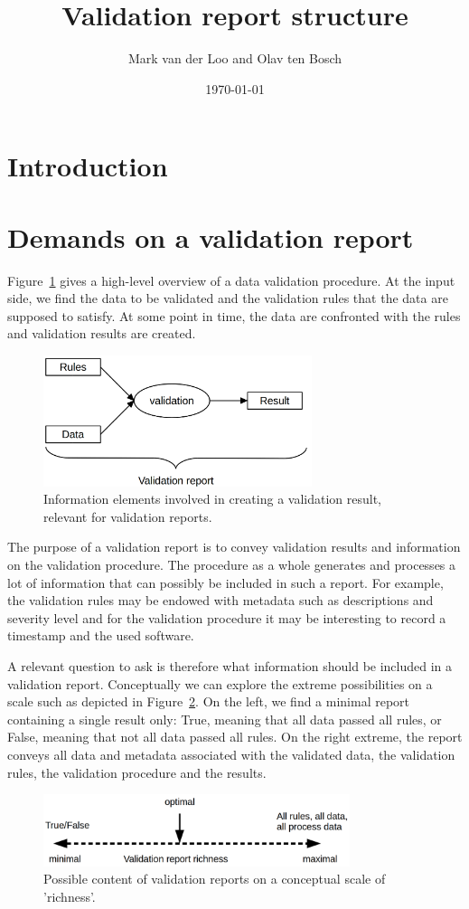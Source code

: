 \documentclass[a4paper, 11pt]{article}
\title{Validation report structure}
\author{Mark van der Loo and Olav ten Bosch}
\date{\today}
\begin{document}
\maketitle{}


\section{Introduction}

\section{Demands on a validation report}
Figure~\ref{fig:validation} gives a high-level overview of a data validation
procedure. At the input side, we find the data to be validated and the
validation rules that the data are supposed to satisfy. At some point in time,
the data are confronted with the rules and validation results are created. 
%
\begin{figure}
\centering
\includegraphics[width=0.7\textwidth]{fig/validation.png}
\caption{Information elements involved in creating a validation result, relevant for validation reports.}
\label{fig:validation}
\end{figure}

The purpose of a validation report is to convey validation results and
information on the validation procedure. The procedure as a whole generates and
processes a lot of information that can possibly be included in such a report.
For example, the validation rules may be endowed with metadata such as
descriptions and severity level and for the validation procedure it may be
interesting to record a timestamp and the used software.

A relevant question to ask is therefore what information should be included in
a validation report. Conceptually we can explore the extreme possibilities on a
scale such as depicted in Figure~\ref{fig:richness}. On the left, we find a minimal report
containing a single result only: True, meaning that all data passed all rules,
or False, meaning that not all data passed all rules. On the right extreme, the
report conveys all data and metadata associated with the validated data, the
validation rules, the validation procedure and the results.
%
\begin{figure}
\centering
\includegraphics[width=0.8\textwidth]{fig/richness.png}
\caption{Possible content of validation reports on a conceptual scale of 'richness'.}
\label{fig:richness}
\end{figure}
\end{document}
